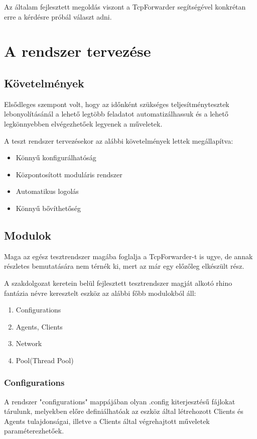 \documentclass[a4paper,12pt,oneside]{report}
\begin{document}
Az általam fejlesztett megoldás viszont a TcpForwarder segítségével konkrétan erre a kérdésre próbál választ adni.

\section{A rendszer tervezése}
\subsection{Követelmények}
Elsődleges szempont volt, hogy az időnként szükséges teljesítménytesztek lebonyolításánál a lehető legtöbb feladatot automatizálhassuk és a lehető legkönnyebben elvégezhetőek legyenek a műveletek.

A teszt rendszer tervezésekor az alábbi követelmények lettek megállapítva:
\begin{itemize}
    \itemsep0em
        \item Könnyű konfigurálhatóság
        \item Központosított moduláris rendszer
        \item Automatikus logolás
        \item Könnyű bővíthetőség
\end{itemize}

\subsection{Modulok}
Maga az egész tesztrendszer magába foglalja a TcpForwarder-t is ugye, de annak részletes bemutatására nem térnék ki, mert az már egy előzőleg elkészült rész.

A szakdolgozat keretein belül fejlesztett tesztrendszer magját alkotó rhino fantázia névre keresztelt eszköz az alábbi főbb modulokból áll:

\begin{enumerate}
    \itemsep0em
        \item Configurations
        \item Agents, Clients
        \item Network
        \item Pool(Thread Pool)
\end{enumerate}

\subsubsection{Configurations}

A rendszer "configurations" mappájában olyan .config kiterjesztésű fájlokat tárulunk, melyekben előre definiálhatóak az eszköz által létrehozott Clients és Agents tulajdonságai, illetve a Clients által végrehajtott műveletek paraméterezhetőek.
\end{document}
